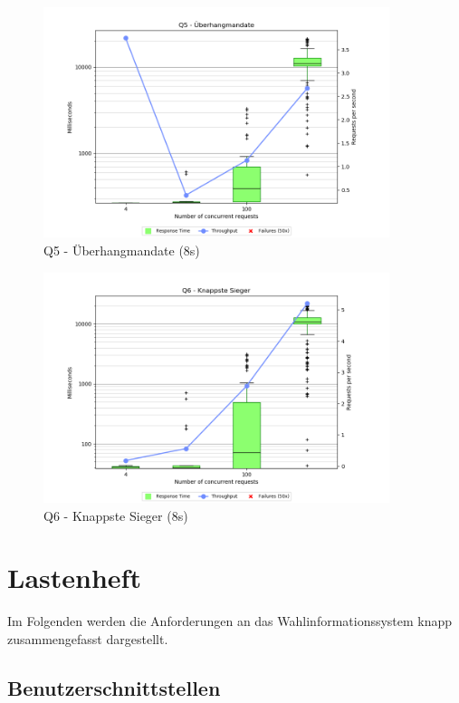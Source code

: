 \documentclass[a4paper]{scrreprt}
\begin{document}
\begin{figure}[h]
\centering
\includegraphics[width=0.9\textwidth]{images/plots_8s/Q5}
\caption {Q5 - Überhangmandate (8s)}
\end{figure}

\begin{figure}[h]
\centering
\includegraphics[width=0.9\textwidth]{images/plots_8s/Q6}
\caption {Q6 - Knappste Sieger (8s)}
\end{figure}


\chapter{Lastenheft}

Im Folgenden werden die Anforderungen an das Wahlinformationssystem knapp zusammengefasst dargestellt.

\section{Benutzerschnittstellen}
\end{document}
